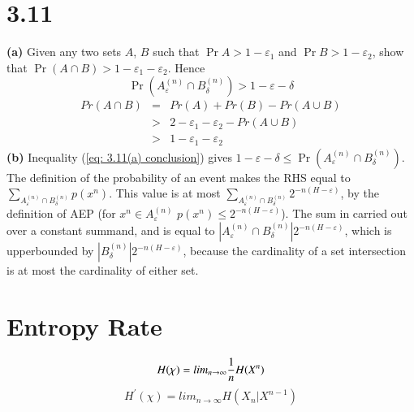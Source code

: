 \documentclass[10pt]{article}
\newcommand{\pref}[1]{{(\ref{#1})}}
\begin{document}
\begin{tiny}
\begin{multicols}{3}
\section*{3.11}
\textbf{(a)}
Given any two sets $A$, $B$ such that $\Pr{A} > 1-\varepsilon_1$ and
$\Pr{B} > 1-\varepsilon_2$, show that $\Pr(A\cap B) > 1 - \varepsilon_1 -
\varepsilon_2$. Hence
\begin{equation}
    \Pr(A_\varepsilon^{(n)} \cap B_\delta^{(n)}) > 1 - \varepsilon - \delta
    \label{eq: 3.11(a) conclusion}
\end{equation}
\proof
\begin{eqnarray}
    Pr(A\cap B) &=& Pr(A) + Pr(B) - Pr(A\cup B)
    \label{eq: pr A intersect B} \\
    &>& 2 - \varepsilon_1 - \varepsilon_2 - Pr(A\cup B)
    \label{eq: sub hypotheses} \\
    &>& 1 - \varepsilon_1 - \varepsilon_2
    \label{eq: 3.11a}
\end{eqnarray}
\textbf{(b)} 
Inequality \pref{eq: 3.11(a) conclusion} gives $1-\varepsilon-\delta \leq \Pr(A_\varepsilon^{(n)} \cap B_\delta^{(n)})$. 
The definition of the probability of an event makes the RHS equal to
$\sum_{A_\varepsilon^{(n)} \cap B_\delta^{(n)}} p(x^n)$.
This value is at most 
$\sum_{A_\varepsilon^{(n)} \cap B_\delta^{(n)}} 2^{-n(H-\varepsilon)}$, 
by the definition of AEP 
(for $x^n \in A_\varepsilon^{(n)}$ $p(x^n) \leq 2^{-n(H - \varepsilon)}$).
The sum in carried out over a constant summand, and is equal to
$|A_\varepsilon^{(n)} \cap B_\delta^{(n)}|2^{-n(H-\varepsilon)}$, which is
upperbounded by $|B_\delta^{(n)}|2^{-n(H-\varepsilon)}$, because the
cardinality of a set intersection is at most the cardinality of either
set.







\section*{Entropy Rate}
\begin{equation}
H(\chi) = lim_{n \to \infty} \frac{1}{n} H(X^n) \\
\end{equation}
\begin{equation}
H^\prime(\chi) = lim_{n \to \infty} H(X_n | X^{n-1})
\end{equation}


\end{multicols}
\end{tiny}
\end{document}
